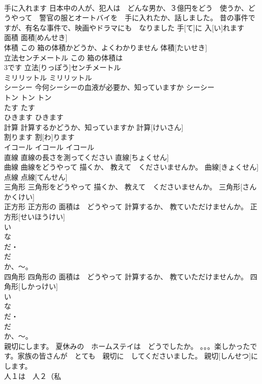 \documentclass[8pt]{extreport}
\begin{document}
\begin{CJK}{UTF8}{min}
\\	手に入れます	日本中の人が、犯人は　どんな男か、３億円をどう　使うか、どうやって　警官の服とオートバイを　手に入れたか、話しました。 昔の事件ですが、有名な事件で、映画やドラマにも　なりました	手[て]に 入[い]れます			
\\	面積		面積[めんせき]					
\\	体積	この 箱の体積かどうか、よくわかりません	体積[たいせき]					
\\	立法センチメートル	この 箱の体積は　
\\	3です	立法[りっぽう]センチメートル			
\\	ミリリットル		ミリリットル						
\\	シーシー	今何シーシーの血液が必要か、知っていますか	シーシー						
\\	トン		トン		トン				
\\	たす		たす						
\\	ひきます		ひきます			
\\	計算	計算するかどうか、知っていますか	計算[けいさん]					
\\	割ります		割[わ]ります			
\\	イコール		イコール		イコール				
\\	直線	直線の長さを測ってください	直線[ちょくせん]					
\\	曲線	曲線をどうやって 描くか、 教えて　くださいませんか。	曲線[きょくせん]					
\\	点線		点線[てんせん]					
\\	三角形	三角形をどうやって 描くか、 教えて　くださいませんか。	三角形[さんかくけい]					
\\	正方形	正方形の 面積は　どうやって 計算するか、 教ていただけませんか。	正方形[せいほうけい]			
\\	い　
\\	な
\\	だ・
\\	だ 
\\	か、～。
\\	四角形	四角形の 面積は　どうやって 計算するか、 教ていただけませんか。	四角形[しかっけい]			
\\	い　
\\	な
\\	だ・
\\	だ 
\\	か、～。
\\	親切にします。	夏休みの　ホームステイは　どうでしたか。 。。。楽しかったです。家族の皆さんが　とても　親切に　してくださいました。	親切[しんせつ]にします。			
\\	人１は　人２（私

\end{CJK}
\end{document}
